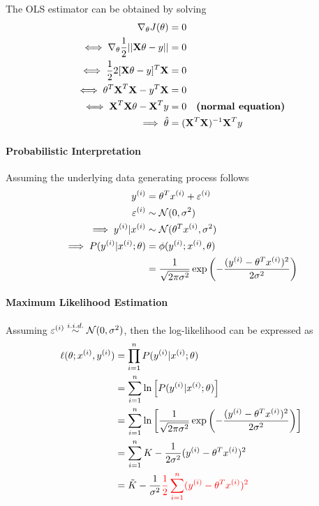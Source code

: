 \documentclass{report}
\newcommand{\upi}[0]{^{(i)}}
\begin{document}
        The OLS estimator can be obtained by solving
        \begin{align}
            \nabla_\theta J(\theta) &= 0 \\
            \iff \nabla_\theta \frac{1}{2} \vert \vert {\textbf{X}\theta - y} \vert \vert &= 0 \\
            \iff \frac{1}{2} 2 [\textbf{X}\theta - y]^T \textbf{X} &= 0 \\
            \iff \theta^T \textbf{X}^T \textbf{X} - y^T \textbf{X} &= 0\\
            \iff \textbf{X}^T \textbf{X} \theta - \textbf{X}^T y &= 0 \quad \textbf{(normal equation)}\\
            \implies \hat{\theta} &= (\textbf{X}^T \textbf{X})^{-1} \textbf{X}^T y
        \end{align}
        \paragraph{Probabilistic Interpretation} Assuming the underlying data generating process follows
        \begin{align}
            y^{(i)} &= \theta^T x^{(i)} + \varepsilon^{(i)} \\
            \varepsilon^{(i)} &\sim \mathcal{{N}}(0, \sigma^2) \\
            \implies y^{(i)}|x^{(i)} &\sim \mathcal{{N}}(\theta^T x^{(i)}, \sigma^2) \\
            \implies P(y^{(i)}|x^{(i)}; \theta) &= \phi(y^{(i)}; x^{(i)}, \theta) \\
            &= \frac{1}{\sqrt{2\pi \sigma^2}} \exp\left(
                -\frac{(y^{(i)} - \theta^T x^{(i)})^2}{2 \sigma^2}
            \right)
        \end{align}
        \paragraph{Maximum Likelihood Estimation} Assuming $\varepsilon\upi \stackrel{i.i.d.}{\sim} \mc{N}(0, \sigma^2)$, then the log-likelihood can be expressed as 
        \begin{align}
            \ell(\theta; x\upi, y\upi) &= \prod_{i=1}^n P(y\upi|x\upi; \theta)\\
            &= \sum_{i=1}^n \ln \left[P(y\upi|x\upi; \theta) \right]\\
            &= \sum_{i=1}^n \ln \left[ \frac{1}{\sqrt{2\pi \sigma^2}} \exp\left(
                -\frac{(y^{(i)} - \theta^T x^{(i)})^2}{2 \sigma^2}
            \right) \right] \\
            &= \sum_{i=1}^n K - \frac{1}{2 \sigma^2}(y^{(i)} - \theta^T x^{(i)})^2 \\
            &= \tilde{K} - \frac{1}{\sigma^2} \red{
                \frac{1}{2} \sum_{i=1}^n (y^{(i)} - \theta^T x^{(i)})^2
            }
        \end{align}
        
\end{document}
